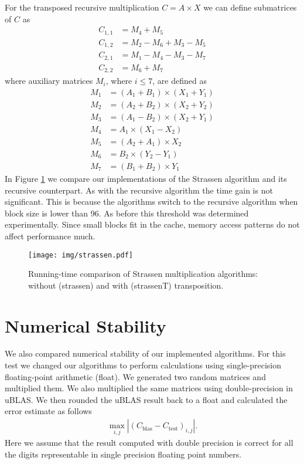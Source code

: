 \documentclass[a4paper,11pt]{article}
\begin{document}
For the transposed recursive multiplication $C = A \times X$ we can define submatrices of $C$ as
\begin{align*}
C_{1,1} &= M_{4} + M_{5}\\
C_{1,2} &= M_{2} - M_{6} + M_{3} - M_{5} \\
C_{2,1} &= M_{1} - M_{4} - M_{3} - M_{7} \\
C_{2,2} &= M_{6} + M_{7}
\end{align*}
where auxiliary matrices $M_{i}$, where $i \leq 7$, are defined as
\begin{align*}
M_{1} &= (A_{1} + B_{1}) \times (X_{1} + Y_{1}) \\
M_{2} &= (A_{2} + B_{2}) \times (X_{2} + Y_{2}) \\
M_{3} &= (A_{1} - B_{2}) \times (X_{2} + Y_{1}) \\
M_{4} &= A_{1} \times (X_{1} - X_{2}) \\
M_{5} &= (A_{2} + A_{1}) \times X_{2} \\
M_{6} &= B_{2} \times (Y_{2} - Y_{1}) \\
M_{7} &= (B_{1} + B_{2}) \times Y_{1}
\end{align*}
In Figure \ref{fig:strassen} we compare our implementations of the Strassen algorithm and its recursive counterpart. As with the recursive algorithm the time gain is not significant. This is because the algorithms switch to the recursive algorithm when block size is lower than 96. As before this threshold was determined experimentally. Since small blocks fit in the cache, memory access patterns do not affect performance much.


\begin{figure}[h]
\centering
\texttt{[image: img/strassen.pdf]}
\caption{Running-time comparison of Strassen multiplication algorithms: without (\textsf{strassen}) and with (\textsf{strassenT}) transposition.}
\label{fig:strassen}
\end{figure}

\section{Numerical Stability}
\label{section:num_stab}

We also compared numerical stability of our implemented algorithms. For this test we changed our algorithms to perform calculations using single-precision floating-point arithmetic (float). We generated two random matrices and multiplied them. We also multiplied the same matrices using double-precision in uBLAS. We then rounded the uBLAS result back to a float and calculated the error estimate as follows
\begin{align*}
\max_{i,j}|(C_{\text{blas}} - C_{\text{test}})_{i,j}|.
\end{align*}
Here we assume that the result computed with double precision is correct for all the digits representable in single precision floating point numbers.
\end{document}

